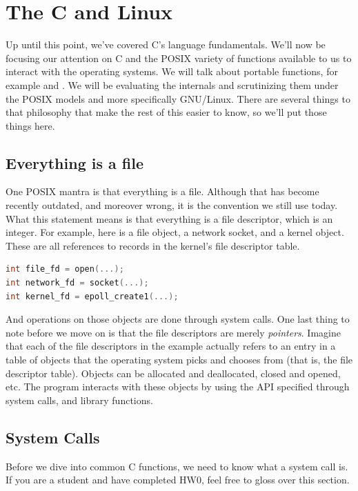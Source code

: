 \section{The C and Linux}

Up until this point, we've covered C's language fundamentals.
We'll now be focusing our attention on C and the POSIX variety of functions available to us to interact with the operating systems.
We will talk about portable functions, for example  and .
We will be evaluating the internals and scrutinizing them under the POSIX models and more specifically GNU/Linux.
There are several things to that philosophy that make the rest of this easier to know, so we'll put those things here.

\subsection{Everything is a file}

One POSIX mantra is that everything is a file.
Although that has become recently outdated, and moreover wrong, it is the convention we still use today.
What this statement means is that everything is a file descriptor, which is an integer.
For example, here is a file object, a network socket, and a kernel object.
These are all references to records in the kernel's file descriptor table.

\begin{lstlisting}[language=C]
int file_fd = open(...);
int network_fd = socket(...);
int kernel_fd = epoll_create1(...);
\end{lstlisting}

And operations on those objects are done through system calls.
One last thing to note before we move on is that the file descriptors are merely \textit{pointers}.
Imagine that each of the file descriptors in the example actually refers to an entry in a table of objects that the operating system picks and chooses from (that is, the file descriptor table).
Objects can be allocated and deallocated, closed and opened, etc.
The program interacts with these objects by using the API specified through system calls, and library functions.

\subsection{System Calls}

Before we dive into common C functions, we need to know what a system call is.
If you are a student and have completed HW0, feel free to gloss over this section.

